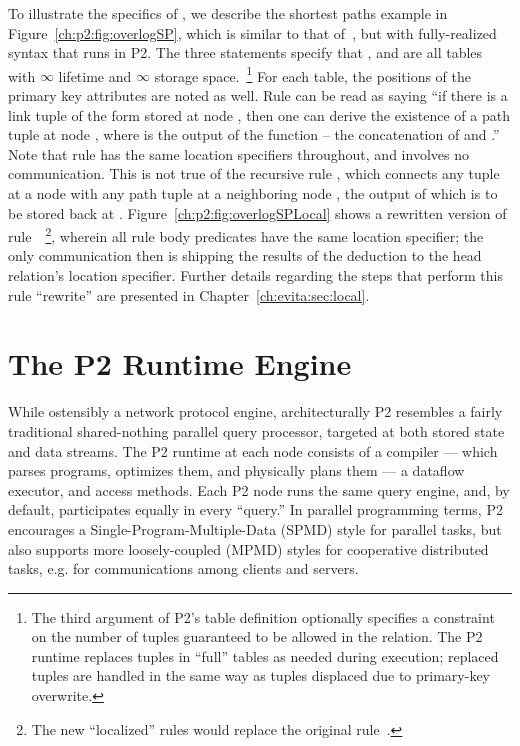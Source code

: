 To illustrate the specifics of \OVERLOG, we describe the shortest paths example
in Figure~\ref{ch:p2:fig:overlogSP}, which is similar to that
of~\cite{loo-sigmod06}, but with fully-realized \OVERLOG syntax that runs in
P2.  The three  statements specify that , 
and  are all tables with $\infty$ lifetime and $\infty$ storage
space.~\footnote{The third argument of P2's table definition optionally specifies
a constraint on the number of tuples guaranteed to be allowed in the relation.
The P2 runtime replaces tuples in ``full'' tables as needed during execution;
replaced tuples are handled in the same way as tuples displaced due to
primary-key overwrite.}  For each table, the positions of the primary key
attributes are noted as well.  Rule  can be read as saying ``if there is
a link tuple of the form  stored at node , then one can
derive the existence of a path tuple  at node , where
 is the output of the function  -- the concatenation of
 and .'' Note that rule  has the same location specifiers
throughout, and involves no communication.  This is not true of the recursive
rule , which connects any  tuple at a node  with any path
tuple at a neighboring node , the output of which is to be stored back at
.  Figure~\ref{ch:p2:fig:overlogSPLocal} shows a rewritten version of
rule~~\footnote{The new ``localized'' rules would replace the original
rule~.}, wherein all rule body predicates have the same location
specifier; the only communication then is shipping the results of the deduction
to the head relation's location specifier.  Further details regarding the steps
that perform this rule ``rewrite'' are presented in
Chapter~\ref{ch:evita:sec:local}.

\section{The P2 Runtime Engine}
\label{ch:p2:sec:p2}

While ostensibly a network protocol engine, architecturally P2 resembles a
fairly traditional shared-nothing parallel query processor, targeted at both
stored state and data streams.  The P2 runtime at each node consists of a
compiler --- which parses programs, optimizes them, and physically plans them
--- a dataflow executor, and access methods.  Each P2 node runs the same query
engine, and, by default, participates equally in every ``query.'' In parallel
programming terms, P2 encourages a Single-Program-Multiple-Data (SPMD) style
for parallel tasks, but also supports more loosely-coupled (MPMD) styles for
cooperative distributed tasks, e.g.  for communications among clients and
servers.

